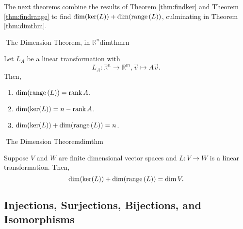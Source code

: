         \pagebreak
        \vphantom
        \\
        \\
        The next theorems combine the results of Theorem \ref{thm:findker} and Theorem \ref{thm:findrange} to find \(\dim(\ker(L))+\dim(\text{range\,}(L))\), culminating in Theorem \ref{thm:dimthm}.
        \begin{theorem}{\Stop\,\,The Dimension Theorem, in \(\mathbb{R}^n\)}{dimthmrn}

            Let \(L_A\) be a linear transformation with
            \begin{equation*}
                L_A:\mathbb{R}^n\to\mathbb{R}^m, \vec{v}\mapsto A\vec{v}.
            \end{equation*}
            Then,
            \begin{enumerate}
                \item \(\dim(\text{range\,}(L))=\text{rank\,} A\).
                \item \(\dim(\ker(L))=n-\text{rank\,} A\).
                \item \(\dim(\ker(L))+\dim(\text{range\,}(L))=n\).
            \end{enumerate}
            
        \end{theorem}
        \begin{theorem}{\Stop\,\,The Dimension Theorem}{dimthm}

            Suppose \(V\) and \(W\) are finite dimensional vector spaces and \(L:V\to W\) is a linear transformation. Then,
            \begin{equation*}
                \dim(\ker(L))+\dim(\text{range\,}(L))=\dim V.
            \end{equation*}
            
        \end{theorem}

    \pagebreak

    \subsection{Injections, Surjections, Bijections, and Isomorphisms}

